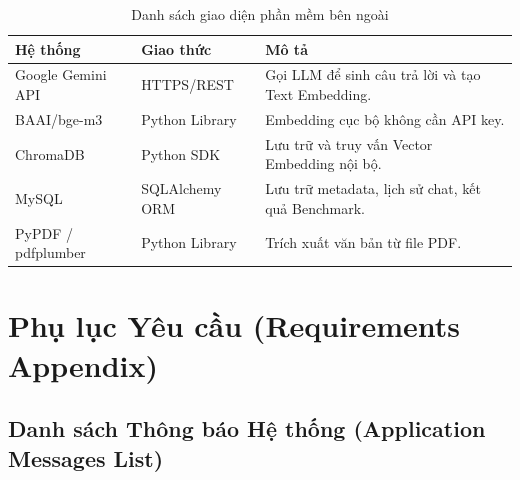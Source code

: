 \begin{table}[H]
  \centering
  \caption{Danh sách giao diện phần mềm bên ngoài}
  \label{tab:sw-interfaces}
  \renewcommand{\arraystretch}{1.4}
  \begin{tabularx}{\textwidth}{|l|l|X|}
    \hline
    \rowcolor{blue!10}
    \textbf{Hệ thống} & \textbf{Giao thức} & \textbf{Mô tả} \\
    \hline
    Google Gemini API & HTTPS/REST & Gọi LLM để sinh câu trả lời và tạo Text Embedding. \\
    \hline
    BAAI/bge-m3 & Python Library & Embedding cục bộ không cần API key. \\
    \hline
    ChromaDB & Python SDK & Lưu trữ và truy vấn Vector Embedding nội bộ. \\
    \hline
    MySQL & SQLAlchemy ORM & Lưu trữ metadata, lịch sử chat, kết quả Benchmark. \\
    \hline
    PyPDF / pdfplumber & Python Library & Trích xuất văn bản từ file PDF. \\
    \hline
  \end{tabularx}
\end{table}

\section{Phụ lục Yêu cầu (Requirements Appendix)}

\subsection{Danh sách Thông báo Hệ thống (Application Messages List)}

